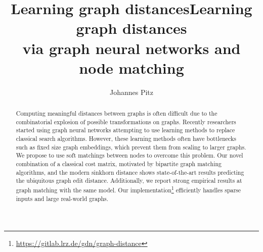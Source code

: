 \documentclass[a4paper,10pt]{article}
\title{Learning graph distances} %
\author{Johannes Pitz} %
\institute{\textit{Guided Research: Data Analytics and Machine Learning Group  \protect\\ TUM Department of Informatics}}
\begin{document}
\title{Learning graph distances \protect\\ via graph neural networks and node matching}
\maketitle

\begin{abstract}


Computing meaningful distances between graphs is often difficult due to the combinatorial explosion of possible transformations on graphs. Recently researchers started using graph neural networks attempting to use learning methods to replace classical search algorithms. However, these learning methods often have bottlenecks such as fixed size graph embeddings, which prevent them from scaling to larger graphs. We propose to use soft matchings between nodes to overcome this problem. Our novel combination of a classical cost matrix, motivated by bipartite graph matching algorithms, and the modern sinkhorn distance shows state-of-the-art results predicting the ubiquitous graph edit distance. Additionally, we report strong empirical results at graph matching with the same model. Our implementation\footnote{\url{https://gitlab.lrz.de/gdn/graph-distance}} efficiently handles sparse inputs and large real-world graphs.






\end{abstract}















\newpage





\newpage


\end{document}
